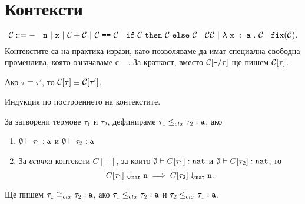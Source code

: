 \section{Контексти}\label{pcf:sect:context}

\[\C ::= -\ |\ \vv{n}\ |\ \vv{x}\ |\ \C + \C\ |\ \C\ \vv{==}\ \C\ |\ \ifelse{\C}{\C}{\C}\ |\ \C\C\ |\ \lamb{x}{a}{\C}\ |\ \fix(\C).\]
Контекстите са на практика изрази, като позволяваме да имат специална свободна променлива, която означаваме с $-$.
За краткост, вместо $\mathcal{C}[\texttt{-}/{\tau}]$ ще пишем $\mathcal{C}[\tau]$.

\begin{proposition}
  Ако $\tau \equiv \tau'$, то $\mathcal{C}[\tau] \equiv \mathcal{C}[\tau']$.
\end{proposition}
\begin{hint}
  Индукция по построението на контекстите.
\end{hint}

\begin{definition}
  За затворени термове $\tau_1$ и $\tau_2$, дефинираме
  $\tau_1 \leq_{ctx} \tau_2 : \texttt{a}$, ако
  \begin{enumerate}[1)]
  \item
    $\emptyset \vdash \tau_1 : \texttt{a}$ и $\emptyset \vdash \tau_2 : \texttt{a}$
  \item
    За \emph{всички} контексти $C[-]$, за които $\emptyset \vdash C[\tau_1] : \texttt{nat}$ и $\emptyset \vdash C[\tau_2] : \texttt{nat}$, то
    \[C[\tau_1] \Downarrow_{\texttt{nat}} \texttt{n} \implies C[\tau_2] \Downarrow_{\texttt{nat}} \texttt{n}.\]
  \end{enumerate}
  Ще пишем $\tau_1 \cong_{ctx} \tau_2 : \texttt{a}$, ако
  $\tau_1 \leq_{ctx} \tau_2 : \texttt{a}$ и $\tau_2 \leq_{ctx} \tau_1 : \texttt{a}$.
\end{definition}

